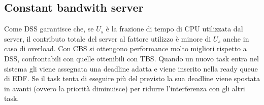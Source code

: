 \documentclass[12pt]{article}
\begin{document}
\subsection{Constant bandwith server}
\label{sec:constantBandwidthServer}
Come DSS garantisce che, se $U_s$ è la frazione di tempo di CPU utilizzata dal server, il contributo totale del server al fattore utilizzo è minore di $U_s$ anche in caso di overload.
Con CBS si ottengono performance molto migliori rispetto a DSS, confrontabili con quelle ottenibili con TBS.
Quando un nuovo task entra nel sistema gli viene assegnata una deadline adatta e viene inserito nella ready queue di EDF.
Se il task tenta di eseguire più del previsto la sua deadline viene spostata in avanti (ovvero la priorità diminuisce) per ridurre l'interferenza con gli altri task.
\end{document}
